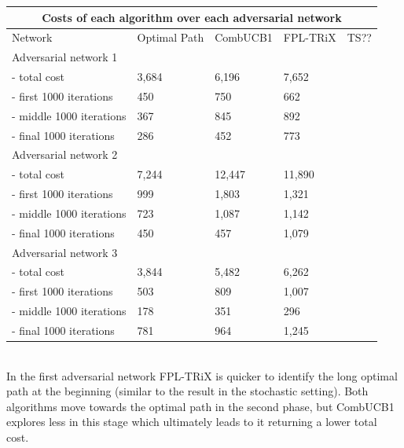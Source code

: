 \begin{tabular}{ |p{4.5cm}||p{2.5cm}|p{2.5cm}|p{2.5cm}|p{2.5cm}|  }
 \hline
 \multicolumn{5}{|c|}{Costs of each algorithm over each adversarial network} \\
 \hline
 Network                    & Optimal Path  & CombUCB1  & FPL-TRiX  & TS??  \\
 \hline
 Adversarial network 1      &               &           &           &       \\
  - total cost              & 3,684         & 6,196     & 7,652     &       \\
  - first 1000 iterations   & 450           & 750       & 662       &       \\
  - middle 1000 iterations  & 367           & 845       & 892       &       \\
  - final 1000 iterations   & 286           & 452       & 773       &       \\
 \hline
 Adversarial network 2      &               &           &           &       \\
  - total cost              & 7,244         & 12,447    & 11,890    &       \\
  - first 1000 iterations   & 999           & 1,803     & 1,321     &       \\
  - middle 1000 iterations  & 723           & 1,087     & 1,142     &       \\
  - final 1000 iterations   & 450           & 457       & 1,079     &       \\
 \hline
 Adversarial network 3      &               &           &           &       \\
  - total cost              & 3,844         & 5,482     & 6,262     &       \\
  - first 1000 iterations   & 503           & 809       & 1,007     &       \\
  - middle 1000 iterations  & 178           & 351       & 296       &       \\
  - final 1000 iterations   & 781           & 964       & 1,245     &       \\
 \hline
\end{tabular}\\

In the first adversarial network FPL-TRiX is quicker to identify the long optimal path at the beginning (similar to the result in the stochastic setting). Both algorithms move towards the optimal path in the second phase, but CombUCB1 explores less in this stage which ultimately leads to it returning a lower total cost.\\

